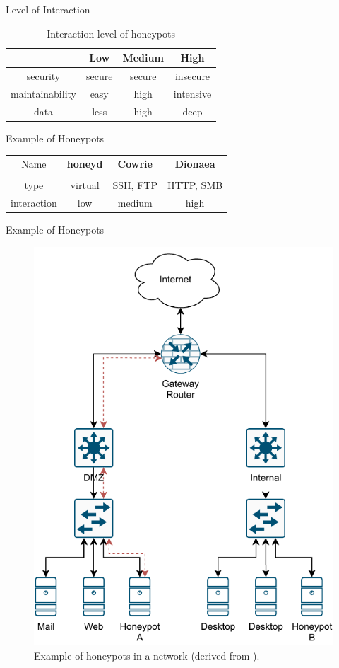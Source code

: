 \begin{frame}{Level of Interaction}
    \begin{table}[]
        \centering
        \caption{Interaction level of honeypots}
        \begin{tabular}{c|c|c|c}
            \toprule
            &\textbf{Low} & \textbf{Medium} & \textbf{High} \\
            \hline
            security & secure & secure & insecure\\
            maintainability & easy & high & intensive \\
            data & less & high & deep \\
            \bottomrule
        \end{tabular}
        \label{tab:interaction-level}
    \end{table}
\end{frame}

\begin{frame}{Example of Honeypots}
    \begin{table}[]
        \centering
        \begin{tabular}{c|c|c|c}
            \toprule
             Name & \textbf{honeyd} & \textbf{Cowrie} & \textbf{Dionaea}\\
             & \cite{Provos2003} & \cite{cowrie2021} & \cite{dionaea2021}\\
             \hline
             type & virtual & SSH, FTP & HTTP, SMB\\
            interaction & low & medium & high\\
            \bottomrule
        \end{tabular}
    \end{table}
\end{frame}

\begin{frame}{Example of Honeypots}
    \begin{figure}
        \centering
        \includegraphics[width=0.5\columnwidth]{img/honeypot-example.pdf}
        \caption[Example of honeypots in a network]{
            Example of honeypots in a network (derived from \cite{Spitzner2003}).
        }
    \end{figure}
\end{frame}

